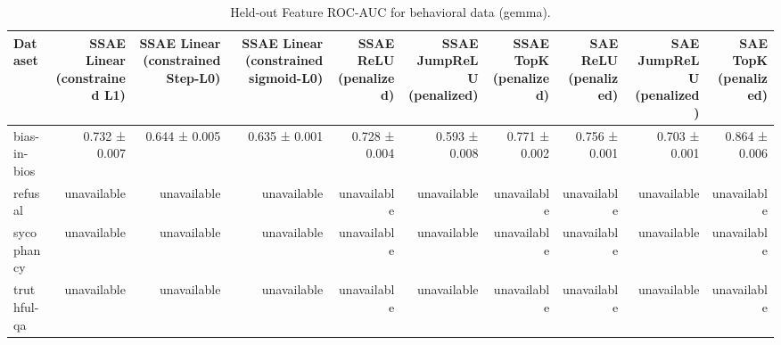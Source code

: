 \begin{table}[t]
\centering
\caption{Held-out Feature ROC-AUC for behavioral data (gemma).}
\label{tab:behavioral-gemma-sae-auc}
\begin{tabular}{lrrrrrrrrr}
\toprule
Dataset & SSAE Linear (constrained L1) & SSAE Linear (constrained Step-L0) & SSAE Linear (constrained sigmoid-L0) & SSAE ReLU (penalized) & SSAE JumpReLU (penalized) & SSAE TopK (penalized) & SAE ReLU (penalized) & SAE JumpReLU (penalized) & SAE TopK (penalized) \\
\midrule
bias-in-bios & 0.732 ± 0.007 & 0.644 ± 0.005 & 0.635 ± 0.001 & 0.728 ± 0.004 & 0.593 ± 0.008 & 0.771 ± 0.002 & 0.756 ± 0.001 & 0.703 ± 0.001 & 0.864 ± 0.006 \\
refusal & unavailable & unavailable & unavailable & unavailable & unavailable & unavailable & unavailable & unavailable & unavailable \\
sycophancy & unavailable & unavailable & unavailable & unavailable & unavailable & unavailable & unavailable & unavailable & unavailable \\
truthful-qa & unavailable & unavailable & unavailable & unavailable & unavailable & unavailable & unavailable & unavailable & unavailable \\
\bottomrule
\end{tabular}
\end{table}
